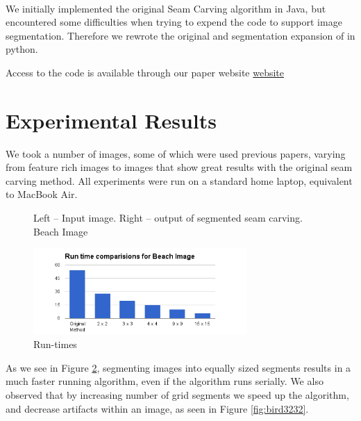 \documentclass[conference]{acmsiggraph}
\begin{document}
\paragraph{}
We initially implemented the original Seam Carving algorithm in Java, but encountered some difficulties when trying to expend the code to support image segmentation. Therefore we rewrote the original and segmentation expansion of in python. 

Access to the code is available through our paper website  \href{https://github.com/tomerwei/seamCarving/blob/master/paper/acmsiggraph/cs269.pdf?raw=true}{website}


\section{Experimental Results}

We took a number of images, some of which were used previous papers, varying from feature rich images to images that show great results with the original seam carving method. All experiments were run on a standard home laptop, equivalent to MacBook Air.


\begin{figure}[ht]       
    \caption{Left -- Input image. Right -- output of segmented seam carving. Beach Image}
    \label{materialflowChart}
\end{figure}


\begin{figure}[ht]
  \centering
  \includegraphics[width=3.2in]{images/beach}
  \caption{ Run-times}
  \label{fig:runtimes}
\end{figure}


As we see in Figure \ref{fig:runtimes}, segmenting images into equally sized segments results in a much faster running algorithm, even if the algorithm runs serially. We also observed that by increasing number of grid segments we speed up the algorithm, and decrease artifacts within an image, as seen in Figure \ref{fig:bird3232}.
\end{document}
